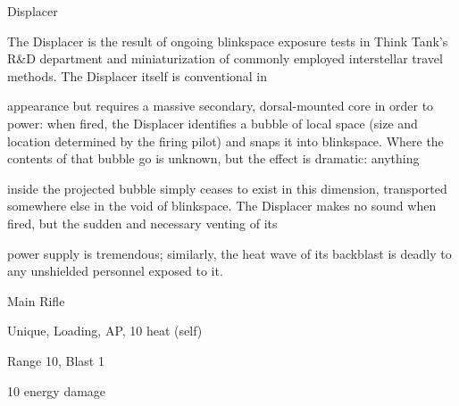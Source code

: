 Displacer

The Displacer is the result of ongoing blinkspace exposure tests in Think Tank's R\&D department and
miniaturization of commonly employed interstellar travel methods. The Displacer itself is conventional in

appearance but requires a massive secondary, dorsal-mounted core in order to power: when fired, the
Displacer identifies a bubble of local space (size and location determined by the firing pilot) and snaps it
into blinkspace. Where the contents of that bubble go is unknown, but the effect is dramatic: anything

inside the projected bubble simply ceases to exist in this dimension, transported somewhere else in the
void of blinkspace. The Displacer makes no sound when fired, but the sudden and necessary venting of its




power supply is tremendous; similarly, the heat wave of its backblast is deadly to any unshielded personnel
exposed to it.

Main Rifle

Unique, Loading, AP, 10 heat (self)

Range 10, Blast 1

10 energy damage
